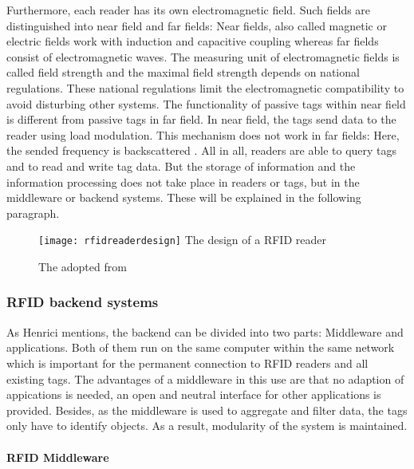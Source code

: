 Furthermore, each reader has its own electromagnetic field. Such fields are distinguished into near field and far fields: Near fields, also called magnetic or electric fields work with induction and capacitive coupling whereas far fields consist of electromagnetic waves. The measuring unit of electromagnetic fields is called field strength and the maximal field strength depends on national regulations. These national regulations limit the electromagnetic compatibility to avoid disturbing other systems. The functionality of passive tags within near field is different from passive tags in far field. In near field, the tags send data to the reader using load modulation. This mechanism does not work in far fields: Here, the sended frequency is backscattered \cite{henrici}.
All in all, readers are able to query tags and to read and write tag data. But the storage of information and the information processing does not take place in readers or tags, but in the middleware or backend systems. These will be explained in the following paragraph.

\begin{figure}
\centering
\texttt{[image: rfidreaderdesign]} The design of a RFID reader 
\caption{\label{fig:readerdesign}The adopted from \cite[p.17]{chipless}} 
\end{figure}

\subsubsection{RFID backend systems} \label{backend}

As Henrici \cite{henrici} mentions, the backend can be divided into two parts: Middleware and applications. Both of them run on the same computer within the same network which is important for the permanent connection to RFID readers and all existing tags. The advantages of a middleware in this use are that no adaption of appications is needed, an open and neutral interface for other applications is provided. Besides, as the middleware is used to aggregate and filter data, the tags only have to identify objects. As a result, modularity of the system is maintained.

\paragraph{RFID Middleware}

